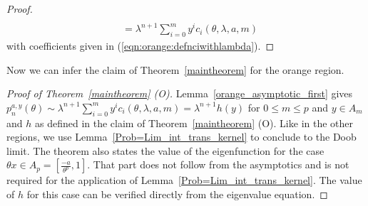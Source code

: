 \documentclass[12pt]{article}
\newcommand{\1}{\mathds{1}}
\theoremstyle{definition}
\theoremstyle{plain}
\theoremstyle{remark}
\begin{document}
\begin{proof}
\begin{align*}
        \\&=\lambda^{n+1}\sum_{i=0}^my^ic_i(\theta,\lambda,a,m)
    \end{align*}
    with coefficients given in (\ref{eqn:orange:defnciwithlambda}).
\end{proof}
Now we can infer the claim of Theorem~\ref{maintheorem} for the orange region.
\begin{proof}[Proof of Theorem~\ref{maintheorem} (O)]%
Lemma~\ref{orange_asymptotic_first} gives
   $p_n^{a,y}(\theta)\sim \lambda^{n+1}\sum_{i=0}^my^ic_i(\theta,\lambda,a, m)=\lambda^{n+1} h(y)$ for $0\le m\le p$ and $y\in A_m$ and $h$ as defined in the claim of Theorem~\ref{maintheorem} (O).   
Like in the other regions, we use Lemma~\ref{Prob=Lim_int_trans_kernel} to conclude to the Doob limit. The theorem also states the value of the eigenfunction for the case $\theta x\in A_p=[\frac{-a}{\theta^p},1]$. That part does not follow from the asymptotics and is not required for the application of Lemma~\ref{Prob=Lim_int_trans_kernel}. The value of $h$ for this case can be verified directly from the eigenvalue equation.
\end{proof}
\end{document}
